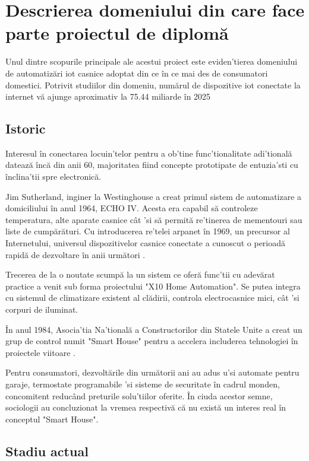 \section {Descrierea domeniului din care face parte proiectul de diplomă}

Unul dintre scopurile principale ale acestui proiect este eviden'tierea domeniului de automatizări \acrshort{iot} casnice adoptat din ce în ce mai des de consumatori domestici. Potrivit studiilor din domeniu, numărul de dispozitive \acrshort{iot} conectate la internet vă ajunge aproximativ la 75.44 miliarde în 2025 \cite{AlamTanweer2018}

\subsection {Istoric}

Interesul în conectarea locuin'telor pentru a ob'tine func'tionalitate adi'tională datează încă din anii 60, majoritatea fiind concepte prototipate de entuzia'sti cu înclina'tii spre electronică.

Jim Sutherland, inginer la Westinghouse a creat primul sistem de automatizare a domiciliului în anul 1964, ECHO IV. Acesta era capabil să controleze temperatura, alte aparate casnice cât 'si să permită re'tinerea de mementouri sau liste de cumpărături. Cu introducerea re'telei \acrfull{arpanet} în 1969, un precursor al Internetului, universul dispozitivelor casnice conectate a cunoscut o perioadă rapidă de dezvoltare în anii următori \cite{ZeusIntegratedSystems}.

Trecerea de la o noutate scumpă la un sistem ce oferă func'tii cu adevărat practice a venit sub forma proiectului "X10 Home Automation". Se putea integra cu sistemul de climatizare existent al clădirii, controla electrocasnice mici, cât 'si corpuri de iluminat.

În anul 1984, Asocia'tia Na'tională a Constructorilor din Statele Unite a creat un grup de control numit "Smart House" pentru a accelera includerea tehnologiei în proiectele viitoare \cite{Aldrich2003Smart}.

Pentru consumatori, dezvoltările din următorii ani au adus u'si automate pentru garaje, termostate programabile 'si sisteme de securitate în cadrul monden, concomitent reducând preturile solu'tiilor oferite. În ciuda acestor semne, sociologii au concluzionat la vremea respectivă că nu există un interes real în conceptul "Smart House".


\subsection {Stadiu actual}

